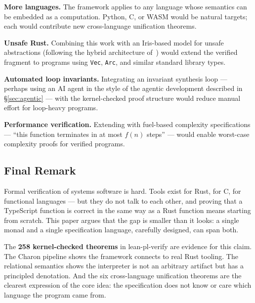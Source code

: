 \textbf{More languages.} The \ProgramSpec framework applies to any language
whose semantics can be embedded as a \RustM computation. Python, C, or WASM
would be natural targets; each would contribute new cross-language unification
theorems.

\textbf{Unsafe Rust.} Combining this work with an Iris-based model for
unsafe abstractions (following the hybrid architecture of~\cite{rustbelt2018})
would extend the verified fragment to programs using \texttt{Vec},
\texttt{Arc}, and similar standard library types.

\textbf{Automated loop invariants.} Integrating an invariant synthesis
loop — perhaps using an AI agent in the style of the agentic development
described in \S\ref{sec:agentic} — with the kernel-checked proof structure
would reduce manual effort for loop-heavy programs.

\textbf{Performance verification.} Extending \ProgramSpec with fuel-based
complexity specifications — ``this function terminates in at most $f(n)$
steps'' — would enable worst-case complexity proofs for verified programs.

\subsection{Final Remark}

Formal verification of systems software is hard. Tools exist for Rust, for C,
for functional languages — but they do not talk to each other, and proving
that a TypeScript function is correct in the same way as a Rust function
means starting from scratch. This paper argues that the gap is smaller than
it looks: a single monad and a single specification language, carefully
designed, can span both.

The \textbf{258 kernel-checked theorems} in lean-pl-verify are evidence for
this claim. The Charon pipeline shows the framework connects to real Rust
tooling. The relational semantics shows the interpreter is not an arbitrary
artifact but has a principled denotation. And the six cross-language
unification theorems are the clearest expression of the core idea: the
specification does not know or care which language the program came from.
